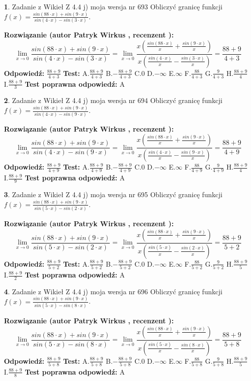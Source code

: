\documentclass[12pt, a4paper]{article}
\theoremstyle{definition} %
\newtheorem{zad}{}
\newcommand{\zadStart}[1]{\begin{zad}#1\newline}
\newcommand{\zadStop}{\end{zad}}
\newcommand{\rozwStart}[2]{\noindent \textbf{Rozwiązanie (autor #1 , recenzent #2): }\newline}
\newcommand{\rozwStop}{\newline}
\newcommand{\odpStart}{\noindent \textbf{Odpowiedź:}\newline}
\newcommand{\odpStop}{\newline}
\newcommand{\testStart}{\noindent \textbf{Test:}\newline}
\newcommand{\testStop}{\newline}
\newcommand{\kluczStart}{\noindent \textbf{Test poprawna odpowiedź:}\newline}
\newcommand{\kluczStop}{\newline}
\begin{document}
\zadStart{Zadanie z Wikieł Z 4.4 j) moja wersja nr 693}
Obliczyć granicę funkcji $f(x)=\frac{sin(88\cdot x) +sin(9\cdot x)}{sin(4\cdot x) -sin(3\cdot x)}$.
\zadStop
\rozwStart{Patryk Wirkus}{}
$$\lim\limits_{x\to 0}\frac{sin(88\cdot x) +sin(9\cdot x)}{sin(4\cdot x) -sin(3\cdot x)}=\lim\limits_{x\to 0}\frac{x(\frac{sin(88\cdot x)}{x}+\frac{sin(9\cdot x)}{x})}{x(\frac{sin(4\cdot x)}{x}-\frac{sin(3\cdot x)}{x})}=\frac{88+9}{4+3}$$
\rozwStop
\odpStart
$\frac{88+9}{4+3}$
\odpStop
\testStart
A.$\frac{88+9}{4+3}$
B.$-\frac{88+9}{4+3}$
C.$0$
D.$-\infty$
E.$\infty$
F.$\frac{88}{4+3}$
G.$\frac{9}{4+3}$
H.$\frac{88+9}{4}$
I.$\frac{88+9}{3}$
\testStop
\kluczStart
A
\kluczStop



\zadStart{Zadanie z Wikieł Z 4.4 j) moja wersja nr 694}
Obliczyć granicę funkcji $f(x)=\frac{sin(88\cdot x) +sin(9\cdot x)}{sin(4\cdot x) -sin(9\cdot x)}$.
\zadStop
\rozwStart{Patryk Wirkus}{}
$$\lim\limits_{x\to 0}\frac{sin(88\cdot x) +sin(9\cdot x)}{sin(4\cdot x) -sin(9\cdot x)}=\lim\limits_{x\to 0}\frac{x(\frac{sin(88\cdot x)}{x}+\frac{sin(9\cdot x)}{x})}{x(\frac{sin(4\cdot x)}{x}-\frac{sin(9\cdot x)}{x})}=\frac{88+9}{4+9}$$
\rozwStop
\odpStart
$\frac{88+9}{4+9}$
\odpStop
\testStart
A.$\frac{88+9}{4+9}$
B.$-\frac{88+9}{4+9}$
C.$0$
D.$-\infty$
E.$\infty$
F.$\frac{88}{4+9}$
G.$\frac{9}{4+9}$
H.$\frac{88+9}{4}$
I.$\frac{88+9}{9}$
\testStop
\kluczStart
A
\kluczStop



\zadStart{Zadanie z Wikieł Z 4.4 j) moja wersja nr 695}
Obliczyć granicę funkcji $f(x)=\frac{sin(88\cdot x) +sin(9\cdot x)}{sin(5\cdot x) -sin(2\cdot x)}$.
\zadStop
\rozwStart{Patryk Wirkus}{}
$$\lim\limits_{x\to 0}\frac{sin(88\cdot x) +sin(9\cdot x)}{sin(5\cdot x) -sin(2\cdot x)}=\lim\limits_{x\to 0}\frac{x(\frac{sin(88\cdot x)}{x}+\frac{sin(9\cdot x)}{x})}{x(\frac{sin(5\cdot x)}{x}-\frac{sin(2\cdot x)}{x})}=\frac{88+9}{5+2}$$
\rozwStop
\odpStart
$\frac{88+9}{5+2}$
\odpStop
\testStart
A.$\frac{88+9}{5+2}$
B.$-\frac{88+9}{5+2}$
C.$0$
D.$-\infty$
E.$\infty$
F.$\frac{88}{5+2}$
G.$\frac{9}{5+2}$
H.$\frac{88+9}{5}$
I.$\frac{88+9}{2}$
\testStop
\kluczStart
A
\kluczStop



\zadStart{Zadanie z Wikieł Z 4.4 j) moja wersja nr 696}
Obliczyć granicę funkcji $f(x)=\frac{sin(88\cdot x) +sin(9\cdot x)}{sin(5\cdot x) -sin(8\cdot x)}$.
\zadStop
\rozwStart{Patryk Wirkus}{}
$$\lim\limits_{x\to 0}\frac{sin(88\cdot x) +sin(9\cdot x)}{sin(5\cdot x) -sin(8\cdot x)}=\lim\limits_{x\to 0}\frac{x(\frac{sin(88\cdot x)}{x}+\frac{sin(9\cdot x)}{x})}{x(\frac{sin(5\cdot x)}{x}-\frac{sin(8\cdot x)}{x})}=\frac{88+9}{5+8}$$
\rozwStop
\odpStart
$\frac{88+9}{5+8}$
\odpStop
\testStart
A.$\frac{88+9}{5+8}$
B.$-\frac{88+9}{5+8}$
C.$0$
D.$-\infty$
E.$\infty$
F.$\frac{88}{5+8}$
G.$\frac{9}{5+8}$
H.$\frac{88+9}{5}$
I.$\frac{88+9}{8}$
\testStop
\kluczStart
A
\kluczStop
\end{document}
